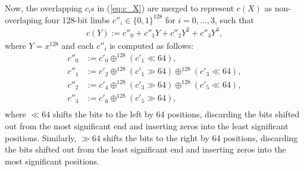  Now, the overlapping $c_i$s in (\ref{eq:c_X}) are merged to represent $c(X)$ as non-overlaping  four 128-bit limbs $c''_i \in \{0,1\}^{128}$ for $i=0,\dots,3$, such that
 \begin{align} \label{eq:c_Y}
 c(Y) := c''_0 + c''_1Y + c''_2Y^2 +  c''_{3}Y^{3},
\end{align}
 where $Y = x^{128}$ and each $c''_i$ is computed as follows:
 \begin{align*}
 	c''_0 &:= c'_0   \oplus^{128} (c'_1 \ll 64),\\
 	c''_1 &:= c'_2   \oplus^{128} (c'_1 \gg 64) \oplus^{128} (c'_3 \ll 64),\\
 	c''_2 &:= c'_4   \oplus^{128} (c'_3 \gg 64) \oplus^{128} (c'_5 \ll 64),\\
 	c''_3 &:= c'_6   \oplus^{128} (c'_5 \gg 64),\\
 \end{align*}
 where $\ll 64$ shifts the bits to the left by 64 positions, discarding the bits shifted out from the most significant end and inserting zeros into the least significant positions. Similarly, $\gg 64$ shifts the bits to the right by 64 positions, discarding the bits shifted out from the least significant end and inserting zeros into the most significant positions.
